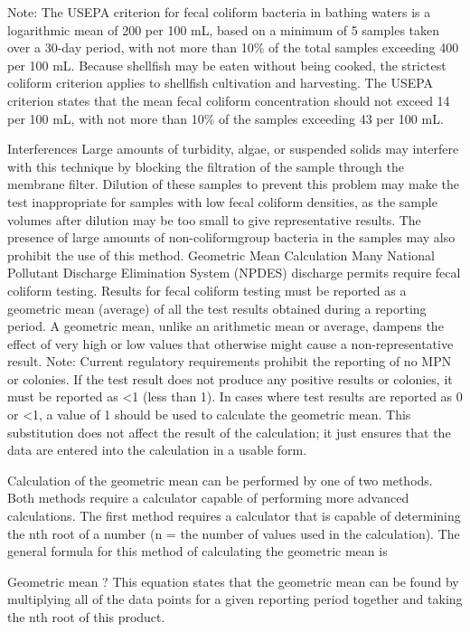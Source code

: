 \documentclass{article}
\begin{document}
Note: The USEPA criterion for fecal coliform bacteria in bathing waters
is a logarithmic mean of 200 per 100 mL, based on a minimum of 5 samples
taken over a 30-day period, with not more than 10\% of the total samples
exceeding 400 per 100 mL. Because shellfish may be eaten without being
cooked, the strictest coliform criterion applies to shellfish
cultivation and harvesting. The USEPA criterion states that the mean
fecal coliform concentration should not exceed 14 per 100 mL, with not
more than 10\% of the samples exceeding 43 per 100 mL.

Interferences Large amounts of turbidity, algae, or suspended solids may
interfere with this technique by blocking the filtration of the sample
through the membrane filter. Dilution of these samples to prevent this
problem may make the test inappropriate for samples with low fecal
coliform densities, as the sample volumes after dilution may be too
small to give representative results. The presence of large amounts of
non-coliformgroup bacteria in the samples may also prohibit the use of
this method. Geometric Mean Calculation Many National Pollutant
Discharge Elimination System (NPDES) discharge permits require fecal
coliform testing. Results for fecal coliform testing must be reported as
a geometric mean (average) of all the test results obtained during a
reporting period. A geometric mean, unlike an arithmetic mean or
average, dampens the effect of very high or low values that otherwise
might cause a non-representative result. Note: Current regulatory
requirements prohibit the reporting of no MPN or colonies. If the test
result does not produce any positive results or colonies, it must be
reported as \textless1 (less than 1). In cases where test results are
reported as 0 or \textless1, a value of 1 should be used to calculate
the geometric mean. This substitution does not affect the result of the
calculation; it just ensures that the data are entered into the
calculation in a usable form.

Calculation of the geometric mean can be performed by one of two
methods. Both methods require a calculator capable of performing more
advanced calculations. The first method requires a calculator that is
capable of determining the nth root of a number (n = the number of
values used in the calculation). The general formula for this method of
calculating the geometric mean is

Geometric mean ? This equation states that the geometric mean can be
found by multiplying all of the data points for a given reporting period
together and taking the nth root of this product.
\end{document}
